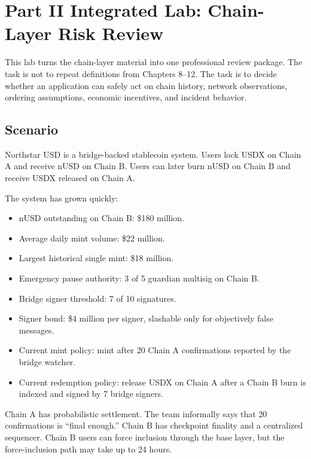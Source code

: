 \chapter*{Part II Integrated Lab: Chain-Layer Risk Review}

\begin{labbox}
This lab turns the chain-layer material into one professional review package. The task is not to repeat definitions from Chapters 8--12. The task is to decide whether an application can safely act on chain history, network observations, ordering assumptions, economic incentives, and incident behavior.
\end{labbox}

\section*{Scenario}

Northstar USD is a bridge-backed stablecoin system. Users lock USDX on Chain A and receive nUSD on Chain B. Users can later burn nUSD on Chain B and receive USDX released on Chain A.

The system has grown quickly:

\begin{itemize}
\item nUSD outstanding on Chain B: \$180 million.
\item Average daily mint volume: \$22 million.
\item Largest historical single mint: \$18 million.
\item Emergency pause authority: 3 of 5 guardian multisig on Chain B.
\item Bridge signer threshold: 7 of 10 signatures.
\item Signer bond: \$4 million per signer, slashable only for objectively false messages.
\item Current mint policy: mint after 20 Chain A confirmations reported by the bridge watcher.
\item Current redemption policy: release USDX on Chain A after a Chain B burn is indexed and signed by 7 bridge signers.
\end{itemize}

Chain A has probabilistic settlement. The team informally says that 20 confirmations is ``final enough.'' Chain B has checkpoint finality and a centralized sequencer. Chain B users can force inclusion through the base layer, but the force-inclusion path may take up to 24 hours.

